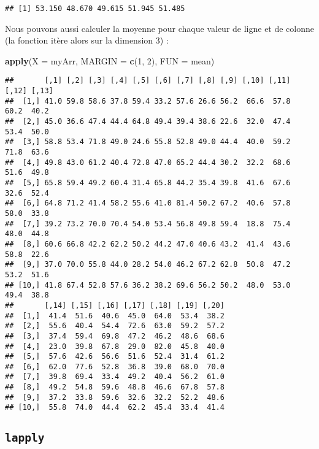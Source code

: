 \documentclass[]{book}
\newenvironment{Shaded}{\begin{snugshade}}{\end{snugshade}}
\newcommand{\KeywordTok}[1]{\textcolor[rgb]{0.13,0.29,0.53}{\textbf{#1}}}
\newcommand{\DataTypeTok}[1]{\textcolor[rgb]{0.13,0.29,0.53}{#1}}
\newcommand{\DecValTok}[1]{\textcolor[rgb]{0.00,0.00,0.81}{#1}}
\newcommand{\NormalTok}[1]{#1}
\theoremstyle{definition}
\theoremstyle{definition}
\theoremstyle{definition}
\theoremstyle{remark}
\begin{document}
\begin{verbatim}
## [1] 53.150 48.670 49.615 51.945 51.485
\end{verbatim}

Nous pouvons aussi calculer la moyenne pour chaque valeur de ligne et de
colonne (la fonction itère alors sur la dimension 3) :

\begin{Shaded}
\begin{Highlighting}[]
\KeywordTok{apply}\NormalTok{(}\DataTypeTok{X =}\NormalTok{ myArr, }\DataTypeTok{MARGIN =} \KeywordTok{c}\NormalTok{(}\DecValTok{1}\NormalTok{, }\DecValTok{2}\NormalTok{), }\DataTypeTok{FUN =}\NormalTok{ mean)}
\end{Highlighting}
\end{Shaded}

\begin{verbatim}
##       [,1] [,2] [,3] [,4] [,5] [,6] [,7] [,8] [,9] [,10] [,11] [,12] [,13]
##  [1,] 41.0 59.8 58.6 37.8 59.4 33.2 57.6 26.6 56.2  66.6  57.8  60.2  40.2
##  [2,] 45.0 36.6 47.4 44.4 64.8 49.4 39.4 38.6 22.6  32.0  47.4  53.4  50.0
##  [3,] 58.8 53.4 71.8 49.0 24.6 55.8 52.8 49.0 44.4  40.0  59.2  71.8  63.6
##  [4,] 49.8 43.0 61.2 40.4 72.8 47.0 65.2 44.4 30.2  32.2  68.6  51.6  49.8
##  [5,] 65.8 59.4 49.2 60.4 31.4 65.8 44.2 35.4 39.8  41.6  67.6  32.6  52.4
##  [6,] 64.8 71.2 41.4 58.2 55.6 41.0 81.4 50.2 67.2  40.6  57.8  58.0  33.8
##  [7,] 39.2 73.2 70.0 70.4 54.0 53.4 56.8 49.8 59.4  18.8  75.4  48.0  44.8
##  [8,] 60.6 66.8 42.2 62.2 50.2 44.2 47.0 40.6 43.2  41.4  43.6  58.8  22.6
##  [9,] 37.0 70.0 55.8 44.0 28.2 54.0 46.2 67.2 62.8  50.8  47.2  53.2  51.6
## [10,] 41.8 67.4 52.8 57.6 36.2 38.2 69.6 56.2 50.2  48.0  53.0  49.4  38.8
##       [,14] [,15] [,16] [,17] [,18] [,19] [,20]
##  [1,]  41.4  51.6  40.6  45.0  64.0  53.4  38.2
##  [2,]  55.6  40.4  54.4  72.6  63.0  59.2  57.2
##  [3,]  37.4  59.4  69.8  47.2  46.2  48.6  68.6
##  [4,]  23.0  39.8  67.8  29.0  82.0  45.8  40.0
##  [5,]  57.6  42.6  56.6  51.6  52.4  31.4  61.2
##  [6,]  62.0  77.6  52.8  36.8  39.0  68.0  70.0
##  [7,]  39.8  69.4  33.4  49.2  40.4  56.2  61.0
##  [8,]  49.2  54.8  59.6  48.8  46.6  67.8  57.8
##  [9,]  37.2  33.8  59.6  32.6  32.2  52.2  48.6
## [10,]  55.8  74.0  44.4  62.2  45.4  33.4  41.4
\end{verbatim}

\subsection{\texorpdfstring{\texttt{lapply}}{lapply}}\label{l17sapply}
\end{document}

